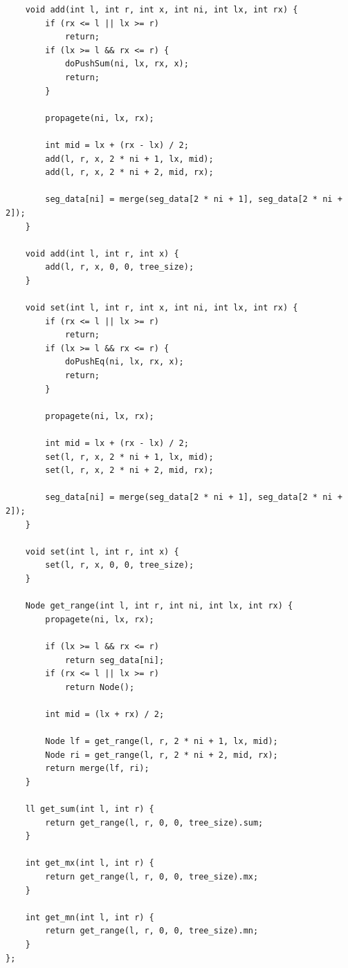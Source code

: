 \documentclass[9pt,a4paper,twocolumn]{extarticle}
\begin{document}
\begin{lstlisting}
    void add(int l, int r, int x, int ni, int lx, int rx) {
        if (rx <= l || lx >= r)
            return;
        if (lx >= l && rx <= r) {
            doPushSum(ni, lx, rx, x);
            return;
        }

        propagete(ni, lx, rx);

        int mid = lx + (rx - lx) / 2;
        add(l, r, x, 2 * ni + 1, lx, mid);
        add(l, r, x, 2 * ni + 2, mid, rx);

        seg_data[ni] = merge(seg_data[2 * ni + 1], seg_data[2 * ni + 2]);
    }

    void add(int l, int r, int x) {
        add(l, r, x, 0, 0, tree_size);
    }

    void set(int l, int r, int x, int ni, int lx, int rx) {
        if (rx <= l || lx >= r)
            return;
        if (lx >= l && rx <= r) {
            doPushEq(ni, lx, rx, x);
            return;
        }

        propagete(ni, lx, rx);

        int mid = lx + (rx - lx) / 2;
        set(l, r, x, 2 * ni + 1, lx, mid);
        set(l, r, x, 2 * ni + 2, mid, rx);

        seg_data[ni] = merge(seg_data[2 * ni + 1], seg_data[2 * ni + 2]);
    }

    void set(int l, int r, int x) {
        set(l, r, x, 0, 0, tree_size);
    }

    Node get_range(int l, int r, int ni, int lx, int rx) {
        propagete(ni, lx, rx);

        if (lx >= l && rx <= r)
            return seg_data[ni];
        if (rx <= l || lx >= r)
            return Node();

        int mid = (lx + rx) / 2;

        Node lf = get_range(l, r, 2 * ni + 1, lx, mid);
        Node ri = get_range(l, r, 2 * ni + 2, mid, rx);
        return merge(lf, ri);
    }

    ll get_sum(int l, int r) {
        return get_range(l, r, 0, 0, tree_size).sum;
    }

    int get_mx(int l, int r) {
        return get_range(l, r, 0, 0, tree_size).mx;
    }

    int get_mn(int l, int r) {
        return get_range(l, r, 0, 0, tree_size).mn;
    }
};
\end{lstlisting}

\filbreak
\end{document}

